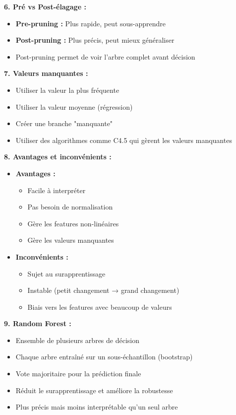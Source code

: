 \documentclass[11pt,a4paper]{article}
\begin{document}
\begin{solutionbox}
\textbf{6. Pré vs Post-élagage :}
\begin{itemize}
    \item \textbf{Pre-pruning :} Plus rapide, peut sous-apprendre
    \item \textbf{Post-pruning :} Plus précis, peut mieux généraliser
    \item Post-pruning permet de voir l'arbre complet avant décision
\end{itemize}

\textbf{7. Valeurs manquantes :}
\begin{itemize}
    \item Utiliser la valeur la plus fréquente
    \item Utiliser la valeur moyenne (régression)
    \item Créer une branche "manquante"
    \item Utiliser des algorithmes comme C4.5 qui gèrent les valeurs manquantes
\end{itemize}

\textbf{8. Avantages et inconvénients :}
\begin{itemize}
    \item \textbf{Avantages :}
    \begin{itemize}
        \item Facile à interpréter
        \item Pas besoin de normalisation
        \item Gère les features non-linéaires
        \item Gère les valeurs manquantes
    \end{itemize}
    \item \textbf{Inconvénients :}
    \begin{itemize}
        \item Sujet au surapprentissage
        \item Instable (petit changement → grand changement)
        \item Biais vers les features avec beaucoup de valeurs
    \end{itemize}
\end{itemize}

\textbf{9. Random Forest :}
\begin{itemize}
    \item Ensemble de plusieurs arbres de décision
    \item Chaque arbre entraîné sur un sous-échantillon (bootstrap)
    \item Vote majoritaire pour la prédiction finale
    \item Réduit le surapprentissage et améliore la robustesse
    \item Plus précis mais moins interprétable qu'un seul arbre
\end{itemize}
\end{solutionbox}
\end{document}
